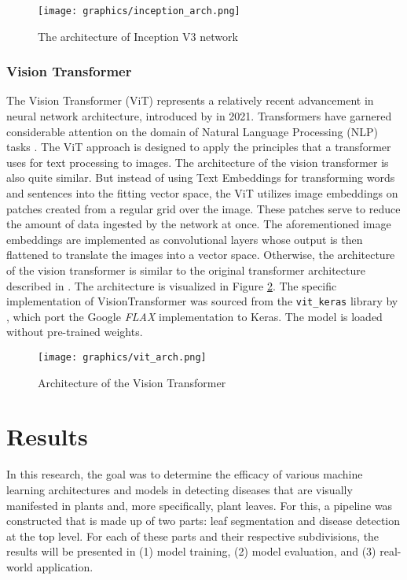 \documentclass[draft,final]{vutinfth} %
\begin{document}
\begin{figure}
    \centering
    \texttt{[image: graphics/inception\_arch.png]}
    \caption{The architecture of Inception V3 network \cite{iparraguirre-villanueva_convolutional_2022}}
    \label{fig:inception_arch}
\end{figure}

\subsection{Vision Transformer} \label{sec:method_vit}
The Vision Transformer (ViT) represents a relatively recent advancement in neural network architecture, introduced by \citeauthor{dosovitskiy_image_2021} in 2021. Transformers have garnered considerable attention on the domain of Natural Language Processing (NLP) tasks \cite{vaswani_attention_2023}. 
The ViT approach is designed to apply the principles that a transformer uses for text processing to images. The architecture of the vision transformer is also quite similar. But instead of using Text Embeddings for transforming words and sentences into the fitting vector space, the ViT utilizes image embeddings on patches created from a regular grid over the image. These patches serve to reduce the amount of data ingested by the network at once. The aforementioned image embeddings are implemented as convolutional layers whose output is then flattened to translate the images into a vector space. Otherwise, the architecture of the vision transformer is similar to the original transformer architecture described in \cite{vaswani_attention_2023} \cite{dosovitskiy_image_2021}. The architecture is visualized in Figure \ref{fig:vit_arch}.
The specific implementation of VisionTransformer was sourced from the \verb|vit_keras| library by \citeauthor{fausto_morales_vit_keras_2020} \cite{fausto_morales_vit_keras_2020}, which port the Google \textit{FLAX} implementation \cite{dosovitskiy_image_2021, tolstikhin_mlp-mixer_2021, steiner_how_2021, chen_when_2021, zhuang_surrogate_2022, zhai_lit_2022} to Keras. The model is loaded without pre-trained weights.

\begin{figure}[ht]
    \centering
    \texttt{[image: graphics/vit\_arch.png]}
    \caption{Architecture of the Vision Transformer \cite{wolfe_using_2022}}
    \label{fig:vit_arch}
\end{figure}

\chapter{Results} \label{sec:results}
In this research, the goal was to determine the efficacy of various machine learning architectures and models in detecting diseases that are visually manifested in plants and, more specifically, plant leaves. For this, a pipeline was constructed that is made up of two parts: leaf segmentation and disease detection at the top level. For each of these parts and their respective subdivisions, the results will be presented in (1) model training, (2) model evaluation, and (3) real-world application.
\end{document}
